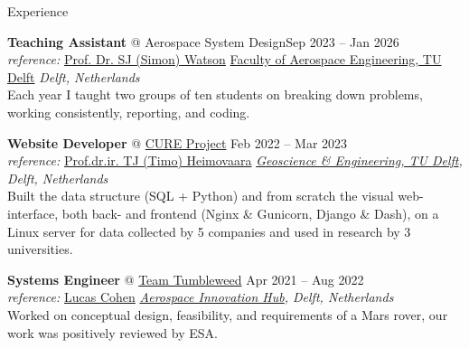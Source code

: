 \documentclass{resume} %
\begin{document}
\begin{rSection}{Experience}

\textbf{Teaching Assistant} @ {Aerospace System Design}\hfill Sep 2023 -- Jan 2026\\
\textit{reference:} \href{https://www.tudelft.nl/staff/s.j.watson/}{Prof. Dr. SJ (Simon) Watson} \hfill \href{https://www.tudelft.nl/en/ae}{Faculty of Aerospace Engineering, TU Delft} \textit{Delft, Netherlands}\\
Each year I taught two groups of ten students on breaking down problems, working consistently, reporting, and coding. 


\textbf{Website Developer} @ \href{https://www.aanmelder.nl/172417}{CURE Project}  \hfill Feb 2022 -- Mar 2023\\
\textit{reference:} \href{https://www.tudelft.nl/en/staff/t.j.heimovaara/}{Prof.dr.ir. TJ (Timo) Heimovaara} \hfill \textit{\href{https://www.tudelft.nl/citg/over-faculteit/afdelingen/geoscience-engineering}{Geoscience \& Engineering, TU Delft}, Delft, Netherlands}\\
Built the data structure (SQL + Python) and from scratch the visual web-interface, both back- and frontend (Nginx \& Gunicorn, Django \& Dash), on a Linux server for data collected by 5 companies and used in research by 3 universities.  




\textbf{Systems Engineer}  @ \href{https://www.teamtumbleweed.eu/mars/}{Team Tumbleweed} \hfill Apr 2021 -- Aug 2022\\
\textit{reference: }\href{https://www.linkedin.com/in/lucascohen-ae/}{Lucas Cohen} \hfill \textit{\href{https://aerospaceinnovationhub.nl/}{Aerospace Innovation Hub}, Delft, Netherlands}\\
Worked on conceptual design, feasibility, and requirements of a Mars rover, our work was positively reviewed by ESA. 




\end{rSection} 
\end{document}
